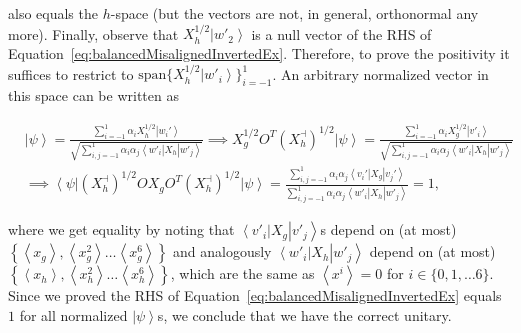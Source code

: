 \documentclass{article}
\begin{document}
also equals the $h$-space (but the vectors are not, in general, orthonormal
any more). Finally, observe that $X_{h}^{1/2}\left|w'_{2}\right\rangle $
is a null vector of the RHS of Equation~\eqref{eq:balancedMisalignedInvertedEx}.
Therefore, to prove the positivity it suffices to restrict
to $\text{span}\{X_{h}^{1/2}\left|w'_{i}\right\rangle \}_{i=-1}^{1}$.
An arbitrary normalized vector in this space can be written as
\begin{footnotesize}
  \begin{align*}
     & \left|\psi\right\rangle   =\frac{\sum_{i=-1}^{1}\alpha_{i}X_{h}^{1/2}\left|w_{i}'\right\rangle }{\sqrt{\sum_{i,j=-1}^{1}\alpha_{i}\alpha_{j}\left\langle w'_{i}\right|X_{h}\left|w'_{j}\right\rangle }}
    \implies X_{g}^{1/2}O^{T}(X_{h}^{\dashv})^{1/2}\left|\psi\right\rangle  =\frac{\sum_{i=-1}^{1}\alpha_{i}X_{g}^{1/2}\left|v'_{i}\right\rangle }{\sqrt{\sum_{i,j=-1}^{1}\alpha_{i}\alpha_{j}\left\langle w'_{i}\right|X_{h}\left|w'_{j}\right\rangle }}                                                                         \\
     & \implies\left\langle \psi\right|(X_{h}^{\dashv})^{1/2}OX_{g}O^{T}(X_{h}^{\dashv})^{1/2}\left|\psi\right\rangle   =\frac{\sum_{i,j=-1}^{1}\alpha_{i}\alpha_{j}\left\langle v_{i}'\right|X_{g}\left|v_{j}'\right\rangle }{\sum_{i,j=-1}^{1}\alpha_{i}\alpha_{j}\left\langle w'_{i}\right|X_{h}\left|w'_{j}\right\rangle }=1,
  \end{align*}
\end{footnotesize}
where we get equality by noting that $\left\langle v'_{i}\right|X_{g}\left|v'_{j}\right\rangle $s
depend on (at most) $\left\{ \left\langle x_{g}\right\rangle ,\left\langle x_{g}^{2}\right\rangle \dots\left\langle x_{g}^{6}\right\rangle \right\} $
and analogously $\left\langle w'_{i}\right|X_{h}\left|w'_{j}\right\rangle $
depend on (at most) $\left\{ \left\langle x_{h}\right\rangle ,\left\langle x_{h}^{2}\right\rangle \dots\left\langle x_{h}^{6}\right\rangle \right\} $,
which are the same as $\left\langle x^{i}\right\rangle =0$
for $i\in\{0,1,\dots6\}$. Since we proved the RHS of Equation~\eqref{eq:balancedMisalignedInvertedEx}
equals $1$ for all normalized $\left|\psi\right\rangle $s, we conclude that
we have the correct unitary.
\end{document}
